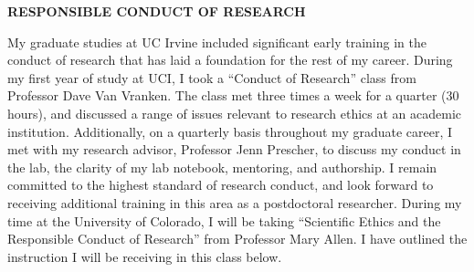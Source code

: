 \documentclass{F32}
\begin{document}

\begin{center}
\bf RESPONSIBLE CONDUCT OF RESEARCH
\end{center}

My graduate studies at UC Irvine included significant early training in the conduct of research that has laid a foundation for the rest of my career. During my first year of study at UCI, I took a ``Conduct of Research'' class from Professor Dave Van Vranken. The class met three times a week for a quarter (30 hours), and discussed a range of issues relevant to research ethics at an academic institution. Additionally, on a quarterly basis throughout my graduate career, I met with my research advisor, Professor Jenn Prescher, to discuss my conduct in the lab, the clarity of my lab notebook, mentoring, and authorship. I remain committed to the highest standard of research conduct, and look forward to receiving additional training in this area as a postdoctoral researcher. During my time at the University of Colorado, I will be taking ``Scientific Ethics and the Responsible Conduct of Research'' from Professor Mary Allen. I have outlined the instruction I will be receiving in this class below.
\end{document}
